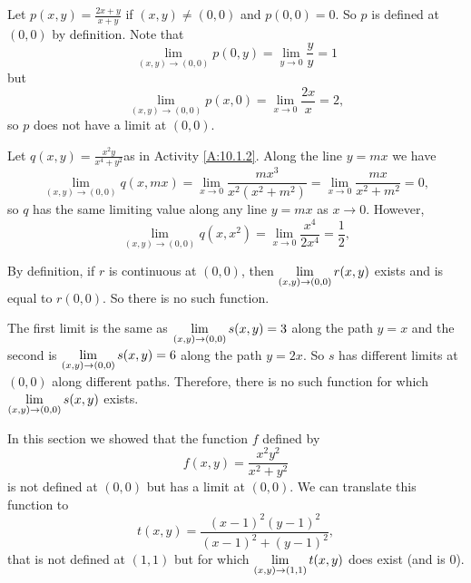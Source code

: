 \begin{exercises}
\begin{exerciseSolution}
    \ba
   	\item Let $p(x,y) = \frac{2x+y}{x+y}$ if $(x,y) \neq (0,0)$ and $p(0,0) = 0$. So $p$ is defined at $(0,0)$ by definition. Note that 
\[\lim_{(x,y) \to (0,0)} p(0,y) = \lim_{y \to 0} \frac{y}{y} = 1\]
but
\[\lim_{(x,y) \to (0,0)} p(x,0) = \lim_{x \to 0} \frac{2x}{x} = 2,\]
so $p$ does not have a limit at $(0,0)$. 
	\item Let $q(x,y) = \frac{x^2y}{x^4+y^2}$as in Activity \ref{A:10.1.2}. Along the line $y=mx$ we have 
\[\lim_{(x,y) \to (0,0)} q(x,mx) = \lim_{x \to 0} \frac{mx^3}{x^2(x^2+m^2)} = \lim_{x \to 0} \frac{mx}{x^2+m^2} = 0,\] 
so $q$ has the same limiting value along any line $y = mx$ as $x \to 0$. However,
\[\lim_{(x,y) \to (0,0)} q(x,x^2) = \lim_{x \to 0} \frac{x^4}{2x^4} = \frac{1}{2},\]
	\item By definition, if $r$ is continuous at $(0,0)$, then $\displaystyle \lim_{(x,y) \to (0,0)} r(x,y)$ exists and is equal to $r(0,0)$. So there is no such function.
	\item The first limit is the same as $\displaystyle \lim_{(x,y) \to (0,0)} s(x,y) = 3$ along the path $y=x$ and the second is $\displaystyle \lim_{(x,y) \to (0,0)} s(x,y) = 6$ along the path $y=2x$. So $s$ has different limits at $(0,0)$ along different paths. Therefore, there is no such function for which $\displaystyle \lim_{(x,y) \to (0,0)} s(x,y)$ exists.
	\item In this section we showed that the function $f$ defined by 
\[f(x,y) = \frac{x^2y^2}{x^2+y^2}\]
is not defined at $(0,0)$ but has a limit at $(0,0)$. We can translate this function to 
\[t(x,y) = \frac{(x-1)^2(y-1)^2}{(x-1)^2+(y-1)^2},\]
that is not defined at $(1,1)$ but for which $\displaystyle \lim_{(x,y) \to (1,1)} t(x,y)$ does exist (and is $0$).
    \ea
\end{exerciseSolution}


\end{exercises}
\afterexercises
